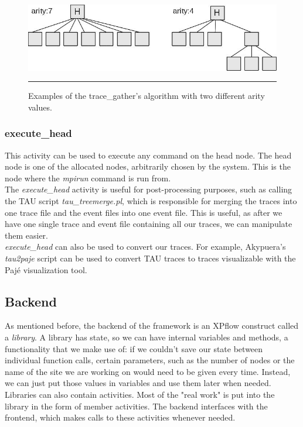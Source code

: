 \begin{figure}[htbp]
  \centering
    \includegraphics[scale=0.7]{./Figures/tracegather_arity.jpg}
    \rule{35em}{0.5pt}
  \caption[Arity in trace\_gather]{Examples of the trace\_gather's
    algorithm with two different arity values.}
  \label{fig:tracegather_arity}
\end{figure}

\subsubsection{execute\_head}
This activity can be used to execute any command on the head node. The
head node is one of the allocated nodes, arbitrarily chosen by the
system. This is the node where the \emph{mpirun} command is run
from.\\
The \emph{execute\_head} activity is useful for post-processing
purposes, such as calling the TAU\cite{sm06} script
\emph{tau\_treemerge.pl}, which is responsible for merging the traces
into one trace file and the event files into one event file. This is
useful, as after we have one single trace and event file containing
all our traces, we can manipulate them easier.\\
\emph{execute\_head} can also be used to convert our traces. For
example, Akypuera's\cite{s13} \emph{tau2paje} script can be used to
convert TAU traces to traces visualizable with the Pajé\cite{cob00}
visualization tool.
\subsection{Backend}
As mentioned before, the backend of the framework is an XPflow
construct called a \emph{library}. A library has state, so we can have
internal variables and methods, a functionality that we make use of:
if we couldn't save our state between individual function calls,
certain parameters, such as the number of nodes or the name of the
site we are working on would need to be given every time. Instead, we
can just put those values in variables and use them later when
needed.\\
Libraries can also contain activities. Most of the "real work" is put
into the library in the form of member activities. The backend
interfaces with the frontend, which makes calls to these activities
whenever needed.
